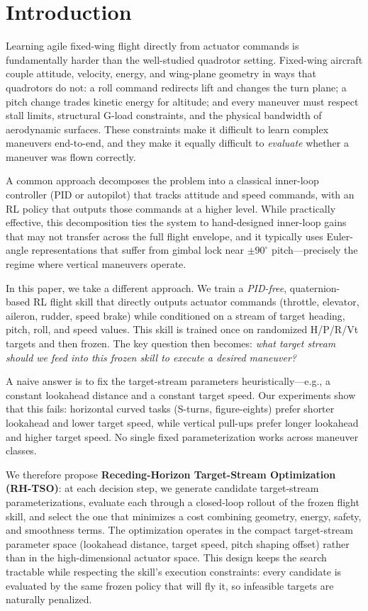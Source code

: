 \documentclass{article}
\begin{document}

\section{Introduction}

Learning agile fixed-wing flight directly from actuator commands is fundamentally harder than the well-studied quadrotor setting.
Fixed-wing aircraft couple attitude, velocity, energy, and wing-plane geometry in ways that quadrotors do not: a roll command redirects lift and changes the turn plane; a pitch change trades kinetic energy for altitude; and every maneuver must respect stall limits, structural G-load constraints, and the physical bandwidth of aerodynamic surfaces.
These constraints make it difficult to learn complex maneuvers end-to-end, and they make it equally difficult to \emph{evaluate} whether a maneuver was flown correctly.

A common approach decomposes the problem into a classical inner-loop controller (PID or autopilot) that tracks attitude and speed commands, with an RL policy that outputs those commands at a higher level.
While practically effective, this decomposition ties the system to hand-designed inner-loop gains that may not transfer across the full flight envelope, and it typically uses Euler-angle representations that suffer from gimbal lock near $\pm90^\circ$ pitch---precisely the regime where vertical maneuvers operate.

In this paper, we take a different approach.
We train a \emph{PID-free}, quaternion-based RL flight skill that directly outputs actuator commands (throttle, elevator, aileron, rudder, speed brake) while conditioned on a stream of target heading, pitch, roll, and speed values.
This skill is trained once on randomized H/P/R/Vt targets and then frozen.
The key question then becomes: \emph{what target stream should we feed into this frozen skill to execute a desired maneuver?}

A naive answer is to fix the target-stream parameters heuristically---e.g., a constant lookahead distance and a constant target speed.
Our experiments show that this fails: horizontal curved tasks (S-turns, figure-eights) prefer shorter lookahead and lower target speed, while vertical pull-ups prefer longer lookahead and higher target speed.
No single fixed parameterization works across maneuver classes.

We therefore propose \textbf{Receding-Horizon Target-Stream Optimization (RH-TSO)}: at each decision step, we generate candidate target-stream parameterizations, evaluate each through a closed-loop rollout of the frozen flight skill, and select the one that minimizes a cost combining geometry, energy, safety, and smoothness terms.
The optimization operates in the compact target-stream parameter space (lookahead distance, target speed, pitch shaping offset) rather than in the high-dimensional actuator space.
This design keeps the search tractable while respecting the skill's execution constraints: every candidate is evaluated by the same frozen policy that will fly it, so infeasible targets are naturally penalized.
\end{document}

